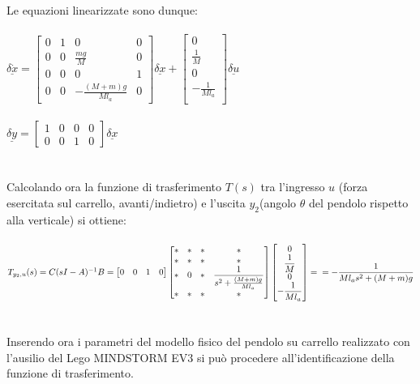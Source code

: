 Le equazioni linearizzate sono dunque:\\\\
$\underline{\delta\dot{x}}=
\begin{bmatrix}
0&1&0&0\\
0&0&\displaystyle\frac{mg}{M}&0\\
0&0&0&1\\
0&0&-\displaystyle\frac{(M+m)g}{Ml_a}&0
\end{bmatrix}
\underline{\delta x}+
\begin{bmatrix}
0\\
\displaystyle\frac{1}{M}\\
0\\
-\displaystyle\frac{1}{Ml_a}\\
\end{bmatrix}
\underline{\delta u}
$\\\\
$\underline{\delta y}=
\begin{bmatrix}
1&0&0&0\\
0&0&1&0
\end{bmatrix}
\underline{\delta x}
$\\\\\\
Calcolando ora la funzione di trasferimento $T(s)$ tra l'ingresso $u$ (forza esercitata sul carrello,
avanti/indietro) e l'uscita $y_2$(angolo $\theta$ del pendolo rispetto alla verticale) si ottiene:\\\\
$T_{y_2,u}(s)=C(sI-A)^{-1}B=
\begin{bmatrix}
0&0&1&0
\end{bmatrix}
\begin{bmatrix}
*&*&*&*\\
*&*&*&*\\
*&0&*&\displaystyle\frac{1}{s^2+\frac{(M+m)g}{Ml_a}}\\
*&*&*&*
\end{bmatrix}
\begin{bmatrix}
0\\
\displaystyle\frac{1}{M}\\
0\\
-\displaystyle\frac{1}{Ml_a}\\
\end{bmatrix} = \\
=-\displaystyle\frac{1}{Ml_as^2+(M+m)g}
$\\\\\\
Inserendo ora i parametri del modello fisico del pendolo su  carrello realizzato con l'ausilio del Lego MINDSTORM EV3 si può procedere all'identificazione della funzione di trasferimento.
